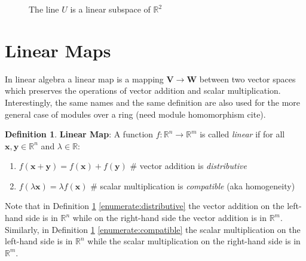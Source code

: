 \documentclass{article}
\theoremstyle{definition}
\newtheorem{definition}{Definition}[section]
\begin{document}
\begin{figure}[H]
{
 }
\caption{The line $U$ is a linear subspace of $\mathbb{R}^{2}$}
\label{fig:linear_subspace}
\end{figure}
%
%
%
\section{Linear Maps}
\label{sec:linear_maps}
In linear algebra a linear map is a mapping $\mathbf{V}\to
\mathbf{W}$ between two vector spaces which preserves the
operations of vector addition and scalar
multiplication. Interestingly, the same names and the same
definition are also used for the more general case of modules
over a ring (need module homomorphism cite).
%
%
%
\begin{definition}
\label{def:linear_map}
{\bf Linear Map}: A function $f:\mathbb{R}^{n} \rightarrow
\mathbb{R}^{m}$ is called \emph{linear} if for all
$\mathbf{x},\mathbf{y} \in \mathbb{R}^{n}$ and $\lambda \in
\mathbb{R}$:

\begin{enumerate}[label=(\alph*)]
\item $f(\mathbf{x}+\mathbf{y}) = f(\mathbf{x})+f(\mathbf{y})$		
		\hspace{3.50em} \# vector addition is \emph{distributive}
\label{enumerate:distributive}

\item $f(\lambda \mathbf{x}) = \lambda f(\mathbf{x})$				
		\hspace{7.30em} \# scalar multiplication is
                \emph{compatible} (aka homogeneity) 
\label{enumerate:compatible}
\end{enumerate}


\noindent
Note that in Definition \ref{def:linear_map}
\ref{enumerate:distributive} the vector addition on the left-hand
side is in $\mathbb{R}^{n}$ while on the right-hand side the
vector addition is in $\mathbb{R}^{m}$. Similarly, in Definition
\ref{def:linear_map} \ref{enumerate:compatible} the scalar
multiplication on the left-hand side is in $\mathbb{R}^{n}$ while
the scalar multiplication on the right-hand side is in
$\mathbb{R}^{m}$.
\end{definition}
\end{document}
